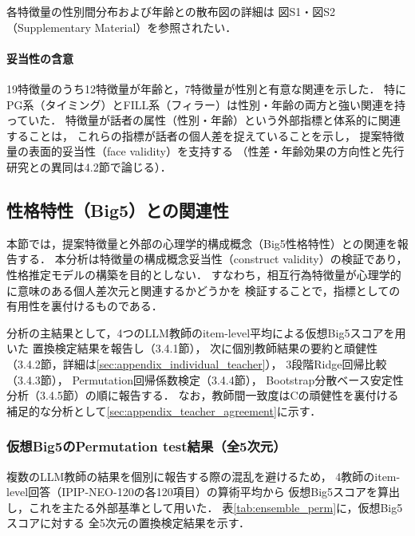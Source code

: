 \documentclass[dvipdfmx,11pt,a4paper]{bxjsarticle}
\renewcommand{\_}{\paperorigunderscore\allowbreak}%
\begin{document}
各特徴量の性別間分布および年齢との散布図の詳細は
図S1・図S2（Supplementary Material）を参照されたい．

\paragraph{妥当性の含意}
19特徴量のうち12特徴量が年齢と，7特徴量が性別と有意な関連を示した．
特にPG系（タイミング）とFILL系（フィラー）は性別・年齢の両方と強い関連を持っていた．
特徴量が話者の属性（性別・年齢）という外部指標と体系的に関連することは，
これらの指標が話者の個人差を捉えていることを示し，
提案特徴量の表面的妥当性（face validity）を支持する
（性差・年齢効果の方向性と先行研究との異同は4.2節で論じる）．

\subsection{性格特性（Big5）との関連性}
\label{sec:result_big5}

本節では，提案特徴量と外部の心理学的構成概念（Big5性格特性）との関連を報告する．
本分析は特徴量の構成概念妥当性（construct validity）の検証であり，
性格推定モデルの構築を目的としない．
すなわち，相互行為特徴量が心理学的に意味のある個人差次元と関連するかどうかを
検証することで，指標としての有用性を裏付けるものである．

分析の主結果として，4つのLLM教師のitem-level平均による仮想Big5スコアを用いた
置換検定結果を報告し（3.4.1節），
次に個別教師結果の要約と頑健性（3.4.2節，詳細は\ref{sec:appendix_individual_teacher}），
3段階Ridge回帰比較（3.4.3節），
Permutation回帰係数検定（3.4.4節），
Bootstrap分散ベース安定性分析（3.4.5節）の順に報告する．
なお，教師間一致度はCの頑健性を裏付ける補足的な分析として\ref{sec:appendix_teacher_agreement}に示す．

\subsubsection{仮想Big5のPermutation test結果（全5次元）}
\label{sec:result_ensemble}

複数のLLM教師の結果を個別に報告する際の混乱を避けるため，
4教師のitem-level回答（IPIP-NEO-120の各120項目）の算術平均から
仮想Big5スコアを算出し，これを主たる外部基準として用いた．
表\ref{tab:ensemble_perm}に，仮想Big5スコアに対する
全5次元の置換検定結果を示す．

\begin{table}[htbp]
\centering
\caption{仮想Big5に対する置換検定結果（全5次元）．
観測相関係数$r_{\text{obs}}$，補正前$p$値，およびHolm法による補正後$p$値を示す．太字は補正後$p < 0.05$．}
\label{tab:ensemble_perm}

\end{table}
\end{document}
